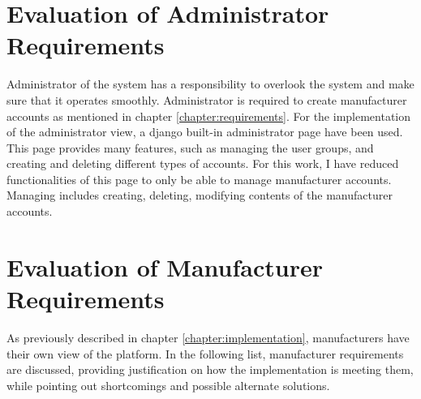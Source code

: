 \section{Evaluation of Administrator Requirements}

Administrator of the system has a responsibility to overlook the system and make sure that it operates smoothly. Administrator is required to create manufacturer accounts as mentioned in chapter \ref{chapter:requirements}. For the implementation of the administrator view, a django built-in administrator page have been used. This page provides many features, such as managing the user groups, and creating and deleting different types of accounts. For this work, I have reduced functionalities of this page to only be able to manage manufacturer accounts. Managing includes creating, deleting, modifying contents of the manufacturer accounts.

\section{Evaluation of Manufacturer Requirements}

As previously described in chapter \ref{chapter:implementation}, manufacturers have their own view of the platform. In the following list, manufacturer requirements are discussed, providing justification on how the implementation is meeting them, while pointing out shortcomings and possible alternate solutions.

